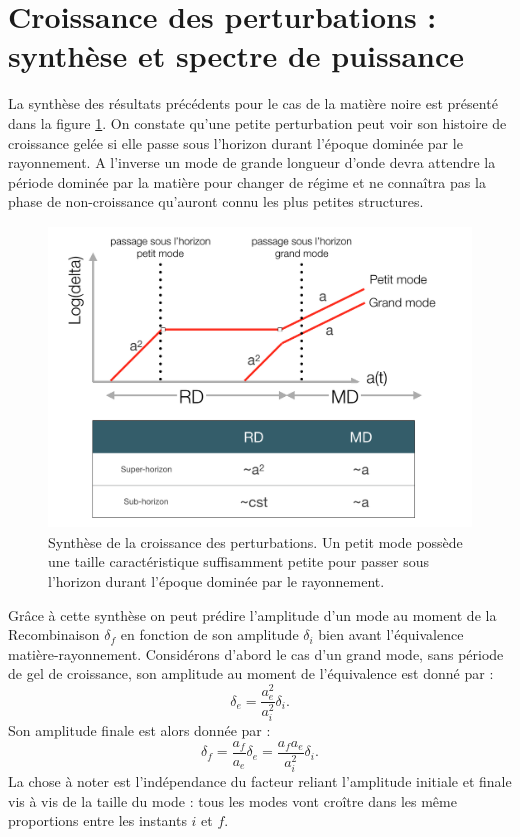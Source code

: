 \section{Croissance des perturbations : synthèse et spectre de puissance}

La synthèse des résultats précédents pour le cas de la matière noire est présenté dans la figure \ref{f:perturb}. On constate qu'une petite perturbation peut voir son histoire de croissance gelée si elle passe sous l'horizon durant l'époque dominée par le rayonnement. A l'inverse un mode de grande longueur d'onde devra attendre la période dominée par la matière pour changer de régime et ne connaîtra pas la phase de non-croissance qu'auront connu les plus petites structures.

\begin{figure}[htbp]
	\centering
		\includegraphics[height=8cm]{figs/perturb.png}
		\caption[Synthèse de la croissance des perturbations]{Synthèse de la croissance des perturbations. Un petit mode possède une taille caractéristique suffisamment petite pour passer sous l'horizon durant l'époque dominée par le rayonnement.}
	\label{f:perturb}
\end{figure}

Grâce à cette synthèse on peut prédire l'amplitude d'un mode au moment de la Recombinaison $\delta_f$ en fonction de son amplitude $\delta_i$ bien avant l'équivalence matière-rayonnement. Considérons d'abord le cas d'un grand mode, sans période de gel de croissance, son amplitude au moment de l'équivalence est donné par :
\begin{equation}
\delta_e=\frac{a_e^2}{a_i^2}\delta_i.
\end{equation}
Son amplitude finale est alors donnée par :
\begin{equation}
\delta_f=\frac{a_f}{a_e}\delta_e=\frac{a_f a_e}{a_i^2}\delta_i.
\end{equation}
La chose à noter est l'indépendance du facteur reliant l'amplitude initiale et finale vis à vis de la taille du mode : tous les modes vont croître dans les même proportions entre les instants $i$ et $f$. 

